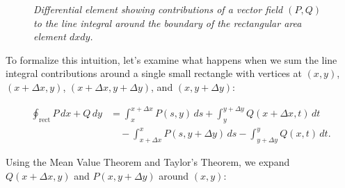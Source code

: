 \begin{figure}[H]
\centering

\caption{\textit{Differential element showing contributions of a vector field $(P,Q)$ to the line integral around the boundary of the rectangular area element $dxdy$.}}
\label{fig:differential_element}
\end{figure}

\noindent To formalize this intuition, let's examine what happens when we sum the line integral contributions around a single small rectangle with vertices at $(x,y)$, $(x+\Delta x,y)$, $(x+\Delta x,y+\Delta y)$, and $(x,y+\Delta y)$:

\begin{align*}
\oint_{\text{rect}} P\,dx + Q\,dy &= \int_{x}^{x+\Delta x} P(s,y)\,ds + \int_{y}^{y+\Delta y} Q(x+\Delta x,t)\,dt \\
&\quad - \int_{x+\Delta x}^{x} P(s,y+\Delta y)\,ds - \int_{y+\Delta y}^{y} Q(x,t)\,dt.
\end{align*}

\noindent Using the Mean Value Theorem and Taylor's Theorem, we expand $Q(x+\Delta x, y)$ and $P(x, y+\Delta y)$ around $(x, y)$:

